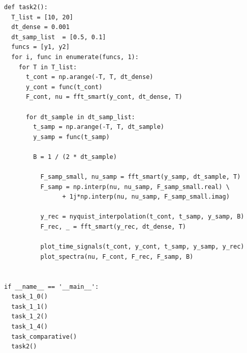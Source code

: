 \documentclass[a4paper]{article}
\begin{document}
\begin{lstlisting}[caption={Исходный код}]
def task2():
  T_list = [10, 20]
  dt_dense = 0.001
  dt_samp_list  = [0.5, 0.1]
  funcs = [y1, y2]
  for i, func in enumerate(funcs, 1):
    for T in T_list:
      t_cont = np.arange(-T, T, dt_dense)
      y_cont = func(t_cont)
      F_cont, nu = fft_smart(y_cont, dt_dense, T)

      for dt_sample in dt_samp_list:
        t_samp = np.arange(-T, T, dt_sample)
        y_samp = func(t_samp)

        B = 1 / (2 * dt_sample)

          F_samp_small, nu_samp = fft_smart(y_samp, dt_sample, T)
          F_samp = np.interp(nu, nu_samp, F_samp_small.real) \
                + 1j*np.interp(nu, nu_samp, F_samp_small.imag)

          y_rec = nyquist_interpolation(t_cont, t_samp, y_samp, B)
          F_rec, _ = fft_smart(y_rec, dt_dense, T)

          plot_time_signals(t_cont, y_cont, t_samp, y_samp, y_rec)
          plot_spectra(nu, F_cont, F_rec, F_samp, B)


if __name__ == '__main__':
  task_1_0()
  task_1_1()
  task_1_2()
  task_1_4()
  task_comparative()
  task2()
\end{lstlisting}
\end{document}
